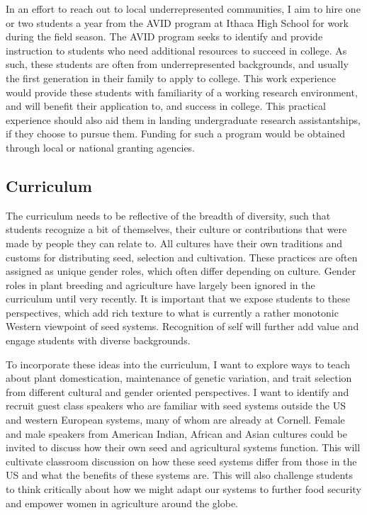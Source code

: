 \documentclass[11pt]{article}
\begin{document}
In an effort to reach out to local underrepresented communities, I aim to hire one or two students a year from the AVID program at Ithaca High School for work during the field season. The AVID program seeks to identify and provide instruction to students who need additional resources to succeed in college. As such, these students are often from underrepresented backgrounds, and usually the first generation in their family to apply to college. This work experience would provide these students with familiarity of a working research environment, and will benefit their application to, and success in college. This practical experience should also aid them in landing undergraduate research assistantships, if they choose to pursue them. Funding for such a program would be obtained through local or national granting agencies.

\subsection*{Curriculum}

The curriculum needs to be reflective of the breadth of diversity, such that students recognize a bit of themselves, their culture or contributions that were made by people they can relate to. All cultures have their own traditions and customs for distributing seed, selection and cultivation. These practices are often assigned as unique gender roles, which often differ depending on culture. Gender roles in plant breeding and agriculture have largely been ignored in the curriculum until very recently. It is important that we expose students to these perspectives, which add rich texture to what is currently a rather monotonic Western viewpoint of seed systems. Recognition of self will further add value and engage students with diverse backgrounds.

To incorporate these ideas into the curriculum, I want to explore ways to teach about plant domestication, maintenance of genetic variation, and trait selection from different cultural and gender oriented perspectives. I want to identify and recruit guest class speakers who are familiar with seed systems outside the US and western European systems, many of whom are already at Cornell. Female and male speakers from American Indian, African and Asian cultures could be invited to discuss how their own seed and agricultural systems function. This will cultivate classroom discussion on how these seed systems differ from those in the US and what the benefits of these systems are. This will also challenge students to think critically about how we might adapt our systems to further food security and empower women in agriculture around the globe. 
\end{document}
